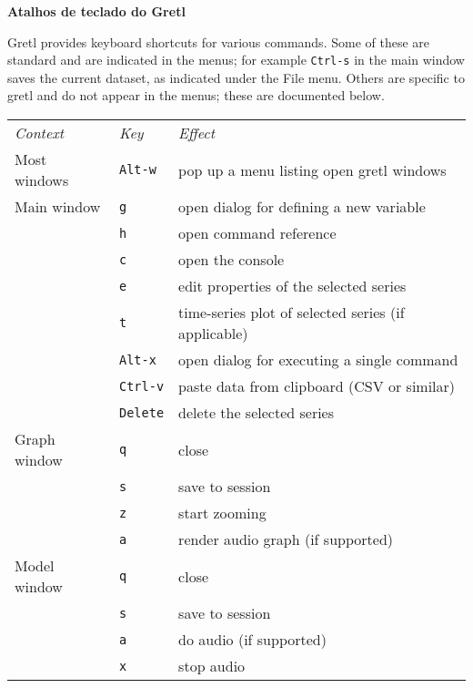 \documentclass{article}
\begin{document}
\setlength{\parindent}{0pt}
\setlength{\parskip}{1ex}
\thispagestyle{empty}

\begin{center}
{\large \textbf{Atalhos de teclado do Gretl}}
\end{center}

\textsf{Gretl} provides keyboard shortcuts for various commands. Some of
these are standard and are indicated in the menus; for example
\texttt{Ctrl-s} in the main window saves the current dataset, as
indicated under the \textsf{File} menu. Others are specific to
\textsf{gretl} and do not appear in the menus; these are documented
below.

\begin{center}
\begin{tabular}{p{}lp{}}
\textit{Context} & \textit{Key} & \textit{Effect} \\[6pt]

Most windows & \texttt{Alt-w} & 
  pop up a menu listing open \textsf{gretl} windows \\[6pt]

Main window & \texttt{g} & 
  open dialog for defining a new variable \\
 & \texttt{h} & open command reference \\
 & \texttt{c} & open the console \\
 & \texttt{e} & edit properties of the selected series \\
 & \texttt{t} & time-series plot of selected series (if applicable) \\
 & \texttt{Alt-x} & open dialog for executing a single command \\
 & \texttt{Ctrl-v} & paste data from clipboard (CSV or similar) \\
 & \texttt{Delete} & delete the selected series \\[6pt]

Graph window & \texttt{q} & close \\
 & \texttt{s} & save to session \\
 & \texttt{z} & start zooming \\
 & \texttt{a} & render audio graph (if supported) \\[6pt]

Model window & \texttt{q} & close \\
 & \texttt{s} & save to session \\
 & \texttt{a} & do audio (if supported) \\
 & \texttt{x} & stop audio \\[6pt]


\end{tabular}
\end{center}
\end{document}
